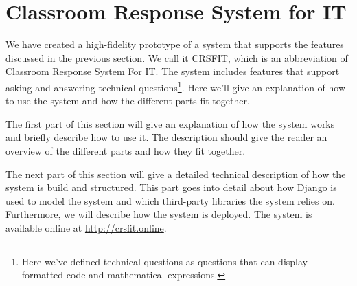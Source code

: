 \section{Classroom Response System for IT}

We have created a high-fidelity prototype of a system that supports the features discussed in the previous section. We call it CRSFIT, which is an abbreviation of Classroom Response System For IT. The system includes features that support asking and answering technical questions\footnote{Here we've defined technical questions as questions that can display formatted code and mathematical expressions.}. Here we'll give an explanation of how to use the system and how the different parts fit together.

The first part of this section will give an explanation of how the system works and briefly describe how to use it. The description should give the reader an overview of the different parts and how they fit together.

The next part of this section will give a detailed technical description of how the system is build and structured. This part goes into detail about how Django is used to model the system and which third-party libraries the system relies on. Furthermore, we will describe how the system is deployed. The system is available online at \url{http://crsfit.online}.

